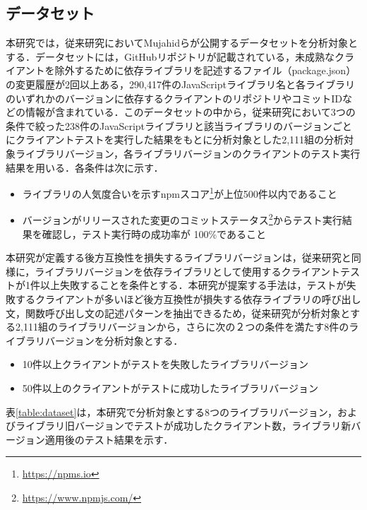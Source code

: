 \documentclass[T,J]{fose} %
\begin{document}
\subsection{データセット}



本研究では，従来研究においてMujahidらが公開するデータセットを分析対象とする．データセットには，GitHubリポジトリが記載されている，未成熟なクライアントを除外するために依存ライブラリを記述するファイル（package.json）の変更履歴が2回以上ある，290,417件のJavaScriptライブラリ名と各ライブラリのいずれかのバージョンに依存するクライアントのリポジトリやコミットIDなどの情報が含まれている．このデータセットの中から，従来研究\cite{matsuda}において3つの条件で絞った238件のJavaScriptライブラリと該当ライブラリのバージョンごとにクライアントテストを実行した結果をもとに分析対象とした2,111組の分析対象ライブラリバージョン，各ライブラリバージョンのクライアントのテスト実行結果を用いる．各条件は次に示す．
\begin{itemize}
\item ライブラリの人気度合いを示すnpmスコア\footnote{\url{https://npms.io}}が上位500件以内であること
\item バージョンがリリースされた変更のコミットステータス\footnote{\url{https://www.npmjs.com/}}からテスト実行結果を確認し，テスト実行時の成功率が 100\%であること
\end{itemize}


本研究が定義する後方互換性を損失するライブラリバージョンは，従来研究\cite{mujahid}と同様に，ライブラリバージョンを依存ライブラリとして使用するクライアントテストが1件以上失敗することを条件とする．本研究が提案する手法は，テストが失敗するクライアントが多いほど後方互換性が損失する依存ライブラリの呼び出し文，関数呼び出し文の記述パターンを抽出できるため，従来研究\cite{matsuda}が分析対象とする2,111組のライブラリバージョンから，さらに次の２つの条件を満たす8件のライブラリバージョンを分析対象とする．
\begin{itemize}
\item 10件以上クライアントがテストを失敗したライブラリバージョン
\item 50件以上のクライアントがテストに成功したライブラリバージョン
\end{itemize}
表\ref{table:dataset}は，本研究で分析対象とする8つのライブラリバージョン，およびライブラリ旧バージョンでテストが成功したクライアント数，ライブラリ新バージョン適用後のテスト結果を示す．
\end{document}
